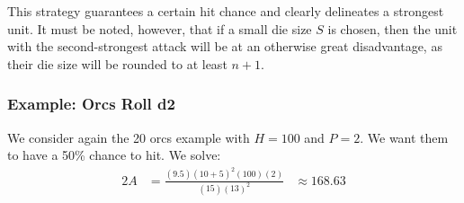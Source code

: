 \documentclass[twocolumn]{article}
\begin{document}
This strategy guarantees a certain hit chance and clearly delineates a strongest unit.
It must be noted, however, that if a small die size $S$ is chosen,
then the unit with the second-strongest attack will be at an otherwise great disadvantage,
as their die size will be rounded to at least $n + 1$.


\subsubsection{Example: Orcs Roll d2}

We consider again the 20 orcs example with $H = 100$ and $P = 2$.
We want them to have a 50\% chance to hit.
We solve:
\begin{alignat*}{2}
    A &= 
        \frac
            {(9.5) (10 + 5)^2 (100) (2)}
            {(15) (13)^2}
        &{}\approx{} 168.63
\end{alignat*}
\end{document}
